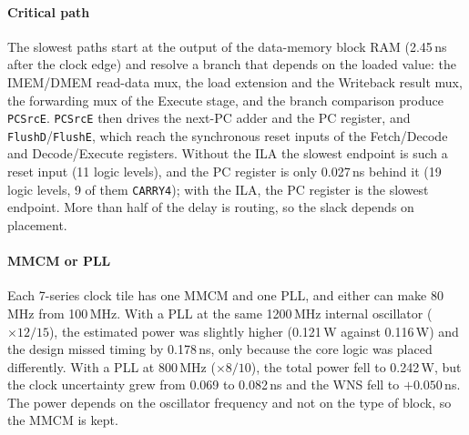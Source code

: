 \paragraph{Critical path}
The slowest paths start at the output of the data-memory block RAM
(2.45\,ns after the clock edge) and resolve a branch that depends on the loaded
value: the IMEM/DMEM read-data mux, the load extension and the Writeback result
mux, the forwarding mux of the Execute stage, and the branch comparison produce
\texttt{PCSrcE}. \texttt{PCSrcE} then drives the next-PC adder and the PC
register, and \texttt{FlushD}/\texttt{FlushE}, which reach the synchronous reset
inputs of the Fetch/Decode and Decode/Execute registers. Without the ILA the
slowest endpoint is such a reset input (11 logic levels), and the PC register is
only 0.027\,ns behind it (19 logic levels, 9 of them \texttt{CARRY4}); with the
ILA, the PC register is the slowest endpoint. More than half of the delay is
routing, so the slack depends on placement.

\paragraph{MMCM or PLL}
Each 7-series clock tile has one MMCM and one PLL, and either can make 80\,MHz
from 100\,MHz. With a PLL at the same 1200\,MHz internal oscillator
($\times 12 / 15$), the estimated power was slightly higher (0.121\,W against
0.116\,W) and the design missed timing by 0.178\,ns, only because the core logic
was placed differently. With a PLL at 800\,MHz ($\times 8 / 10$), the total power
fell to 0.242\,W, but the clock uncertainty grew from 0.069 to 0.082\,ns and the
WNS fell to $+0.050$\,ns. The power depends on the oscillator frequency and not
on the type of block, so the MMCM is kept.
